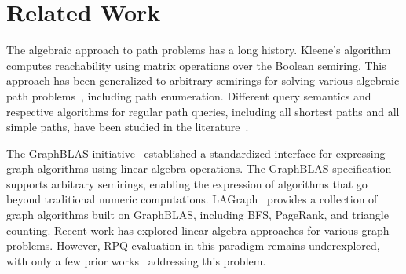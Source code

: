 \section{Related Work}\label{sec:related-work}

The algebraic approach to path problems has a long history. Kleene's algorithm computes reachability using matrix operations over the Boolean semiring.
This approach has been generalized to arbitrary semirings for solving various algebraic path problems~\cite{graph-using-la}, including path enumeration.
Different query semantics and respective algorithms for regular path queries, including all shortest paths and all simple paths, have been studied in the literature~\cite{martens_et_al:LIPIcs.ICDT.2018.19,Mendelzon1989FindingRS,DBLP:journals/corr/abs-2204-11137}.

The GraphBLAS initiative~\cite{Kepner2016MathematicalFO,brock2021graphblas,10.1145/3577195} established a standardized interface for expressing graph algorithms using linear algebra operations.
The GraphBLAS specification supports arbitrary semirings, enabling the expression of algorithms that go beyond traditional numeric computations.
LAGraph~\cite{lagraph} provides a collection of graph algorithms built on GraphBLAS, including BFS, PageRank, and triangle counting.
Recent work has explored linear algebra approaches for various graph problems.
However, RPQ evaluation in this paradigm remains underexplored, with only a few prior works~\cite{10.1007/978-3-031-43980-3_4,belyanin2150single} addressing this problem.

